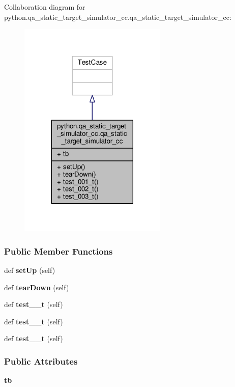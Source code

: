 Collaboration diagram for python.\+qa\+\_\+static\+\_\+target\+\_\+simulator\+\_\+cc.\+qa\+\_\+static\+\_\+target\+\_\+simulator\+\_\+cc\+:
\nopagebreak
\begin{figure}[H]
\begin{center}
\leavevmode
\includegraphics[width=200pt]{d1/d24/classpython_1_1qa__static__target__simulator__cc_1_1qa__static__target__simulator__cc__coll__graph}
\end{center}
\end{figure}
\subsubsection*{Public Member Functions}
\begin{DoxyCompactItemize}
\item 
def {\bf set\+Up} (self)
\item 
def {\bf tear\+Down} (self)
\item 
def {\bf test\+\_\+\_\+t} (self)
\item 
def {\bf test\+\_\+\_\+t} (self)
\item 
def {\bf test\+\_\+\_\+t} (self)
\end{DoxyCompactItemize}
\subsubsection*{Public Attributes}
\begin{DoxyCompactItemize}
\item 
{\bf tb}
\end{DoxyCompactItemize}



